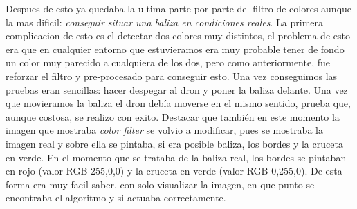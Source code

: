 \hspace{1cm} Despues de esto ya quedaba la ultima parte por parte del filtro de colores aunque la mas dificil: \textit{conseguir situar una baliza en condiciones reales}. La primera complicacion de esto es el detectar dos colores muy distintos, el problema de esto era que en cualquier entorno que estuvieramos era muy probable tener de fondo un color muy parecido a cualquiera de los dos, pero como anteriormente, fue reforzar el filtro y pre-procesado para conseguir esto. Una vez conseguimos las pruebas eran sencillas: hacer despegar al dron y poner la baliza delante. Una vez que movieramos la baliza el dron deb\'ia moverse en el mismo sentido, prueba que, aunque costosa, se realizo con exito. Destacar que tambi\'en en este momento la imagen que mostraba \textit{color filter} se volvio a modificar, pues se mostraba la imagen real y sobre ella se pintaba, si era posible baliza, los bordes y la cruceta en verde. En el momento que se trataba de la baliza real, los bordes se pintaban en rojo (valor RGB 255,0,0) y la cruceta en verde (valor RGB 0,255,0). De esta forma era muy facil saber, con solo visualizar la imagen, en que punto se encontraba el algoritmo y si actuaba correctamente.


